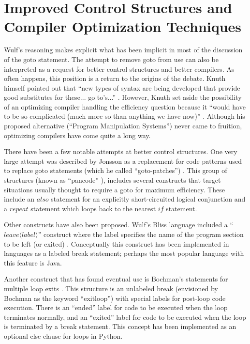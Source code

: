 \documentclass[letterpaper,12pt]{article}
\begin{document}
\section{Improved Control Structures and Compiler Optimization Techniques}

Wulf's reasoning makes explicit what has been implicit in most of the discussion
of the goto statement.  The attempt to remove goto from use can also be
interpreted as a request for better control structures and better compilers.
As often happens, this position is a return to the origins of the debate.  Knuth
himself pointed out that ``new types of syntax are being developed that provide
good substitutes for these... go to's...'' \cite{knuth}.  However, Knuth set
aside the possibility of an optimizing compiler handling the efficiency question
because it ``would have to be so complicated (much more so than anything we
have now)'' \cite{knuth}.  Although his proposed alternative (``Program
Manipulation Systems'') never came to fruition, optimizing compilers have
come quite a long way.

There have been a few notable attempts at better control structures.  One very
large attempt was described by Jonsson as a replacement for code patterns used
to replace goto statements (which he called ``goto-patches'') \cite{jonsson}.
This group of structures (known as ``pancode'' \cite{jonsson_pancode}), includes
several constructs that target situations usually thought to require a goto for
maximum efficiency. These include an $also$ statement for an explicitly short-circuited
logical conjunction and a $repeat$ statement which loops back to the nearest
$if$ statement.

Other constructs have also been proposed.  Wulf's Bliss language included a
``$leave \langle label \rangle$'' construct where the label specifies the name
of the program section to be left (or exited) \cite{wulf-leave}.  Conceptually
this construct has been implemented in languages as a labeled break statement;
perhaps the most popular language with this feature is Java.

Another construct that has found eventual use is Bochman's statements for
multiple loop exits \cite{bochman}.  This structure is an unlabeled break
(envisioned by Bochman as the keyword ``exitloop'') with special labels for
post-loop code execution.  There is an ``ended'' label for code to be executed
when the loop terminates normally, and an ``exited'' label for code to be
executed when the loop is terminated by a break statement.  This concept has
been implemented as an optional else clause for loops in Python.
\end{document}
